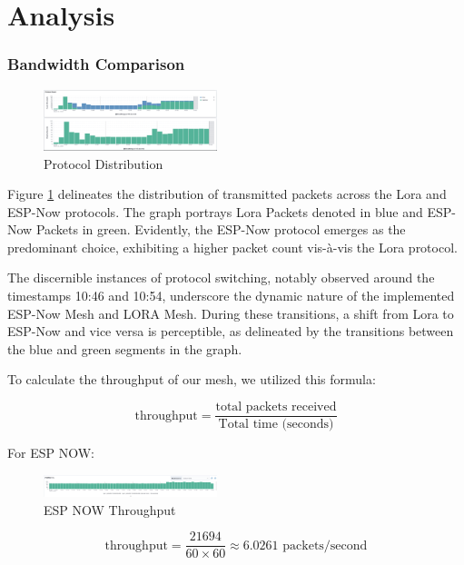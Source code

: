 \section{Analysis}\label{sec:analysis}

\subsubsection{Bandwidth Comparison}\label{sec:bandwidth_comparison}
\begin{figure}[H]
  \begin{center}
    \includegraphics[width=0.45\textwidth]{./Figures/elk/protocol_count.png}
  \end{center}
  \caption{Protocol Distribution}\label{fig:protocol_distribution}
\end{figure}

Figure \ref{fig:protocol_distribution} delineates the distribution of transmitted packets across the Lora and ESP-Now protocols. The graph portrays Lora Packets denoted in blue and ESP-Now Packets in green. Evidently, the ESP-Now protocol emerges as the predominant choice, exhibiting a higher packet count vis-à-vis the Lora protocol.

The discernible instances of protocol switching, notably observed around the timestamps 10:46 and 10:54, underscore the dynamic nature of the implemented ESP-Now Mesh and LORA Mesh. During these transitions, a shift from Lora to ESP-Now and vice versa is perceptible, as delineated by the transitions between the blue and green segments in the graph.

To calculate the throughput of our mesh, we utilized this formula:

\[
\text{throughput} = \frac{\text{total packets received}}{\text{Total time (seconds)}}
\]

For ESP NOW:
\begin{figure}[H]
  \begin{center}
    \includegraphics[width=0.45\textwidth]{./Figures/elk/espnow.png}
  \end{center}
  \caption{ESP NOW Throughput}\label{fig:espnowthroughput}
\end{figure}
\[
\text{throughput} = \frac{21694}{60 \times 60} \approx 6.0261 \text{ packets/second}
\]

